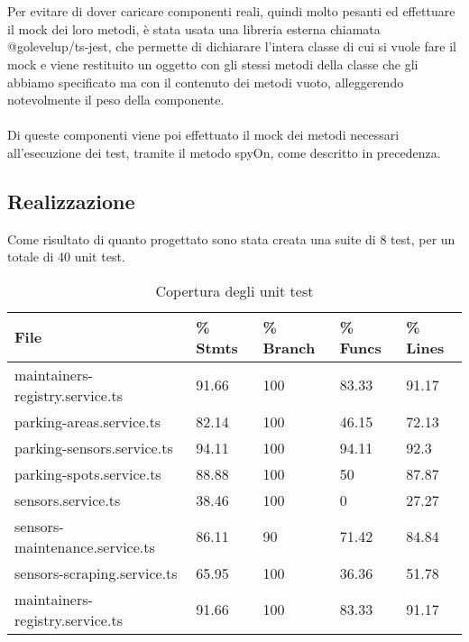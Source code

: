 \\\\
Per evitare di dover caricare componenti reali, quindi molto pesanti ed effettuare il \gls{mock} dei loro metodi, è stata
usata una libreria esterna chiamata @golevelup/ts-jest, che permette di dichiarare l'intera classe di cui si vuole fare
il \gls{mock} e viene restituito un oggetto con gli stessi metodi della classe che gli abbiamo specificato ma con il contenuto 
dei metodi vuoto, 
alleggerendo notevolmente il peso della componente.
\\\\
Di queste componenti viene poi effettuato il \gls{mock} dei metodi necessari all'esecuzione dei test, tramite il metodo
spyOn, come descritto in precedenza.
\clearpage
\subsection{Realizzazione}
Come risultato di quanto progettato sono stata creata una suite di 8 test, per un totale di 40 unit test.
\begin{table}[H]
    \begin{tabular}{|p{4.8cm}|p{1.5cm}|p{1.7cm}|p{1.5cm}| p{1.4cm} |} 
    \hline
    \textbf{File} & \textbf{\% Stmts} & \textbf{\% Branch} &  \textbf{\% Funcs} & \textbf{\% Lines} \\ 
    \hline
    maintainers-registry.service.ts & 91.66 & 100 & 83.33 & 91.17 \\ 
    \hline
    parking-areas.service.ts & 82.14 & 100 & 46.15 & 72.13 \\ 
    \hline
    parking-sensors.service.ts & 94.11 & 100 & 94.11 & 92.3 \\ 
    \hline
    parking-spots.service.ts & 88.88 & 100 & 50 & 87.87 \\ 
    \hline
    sensors.service.ts & 38.46 & 100 & 0 & 27.27 \\ 
    \hline
    sensors-maintenance.service.ts & 86.11 & 90 & 71.42 & 84.84 \\ 
    \hline
    sensors-scraping.service.ts & 65.95 & 100 & 36.36 & 51.78 \\ 
    \hline
    maintainers-registry.service.ts & 91.66 & 100 & 83.33 & 91.17 \\ 
    \hline
    \end{tabular}
    \caption{Copertura degli unit test}
\end{table}

